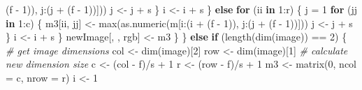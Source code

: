 \documentclass[
  12pt,
]{krantz}
\makeatletter
\newenvironment{Shaded}{\begin{snugshade}}{\end{snugshade}}
\newcommand{\AttributeTok}[1]{\textcolor[rgb]{0.61,0.61,0.61}{#1}}
\newcommand{\CommentTok}[1]{\textcolor[rgb]{0.37,0.37,0.37}{\textit{#1}}}
\newcommand{\ControlFlowTok}[1]{\textcolor[rgb]{0.27,0.27,0.27}{\textbf{#1}}}
\newcommand{\DecValTok}[1]{\textcolor[rgb]{0.06,0.06,0.06}{#1}}
\newcommand{\FunctionTok}[1]{\textcolor[rgb]{0,0,0}{#1}}
\newcommand{\NormalTok}[1]{#1}
\newcommand{\OtherTok}[1]{\textcolor[rgb]{0.37,0.37,0.37}{#1}}
\newcommand{\SpecialCharTok}[1]{\textcolor[rgb]{0,0,0}{#1}}
\newenvironment{kframe}{%
\medskip{}
\setlength{\fboxsep}{.8em}
 \def\at@end@of@kframe{}%
 \ifinner\ifhmode%
  \def\at@end@of@kframe{\end{minipage}}%
  \begin{minipage}{\columnwidth}%
 \fi\fi%
 \def\FrameCommand##1{\hskip\@totalleftmargin \hskip-\fboxsep
 \colorbox{shadecolor}{##1}\hskip-\fboxsep
     \hskip-\linewidth \hskip-\@totalleftmargin \hskip\columnwidth}%
 \MakeFramed {\advance\hsize-\width
   \@totalleftmargin\z@ \linewidth\hsize
   \@setminipage}}%
 {\par\unskip\endMakeFramed%
 \at@end@of@kframe}
\renewenvironment{Shaded}{\begin{kframe}}{\end{kframe}}
\makeatother
\begin{document}
\begin{Shaded}
\begin{Highlighting}[]
\NormalTok{                      (f }\SpecialCharTok{{-}} \DecValTok{1}\NormalTok{)), j}\SpecialCharTok{:}\NormalTok{(j }\SpecialCharTok{+}\NormalTok{ (f }\SpecialCharTok{{-}} \DecValTok{1}\NormalTok{))]))}
\NormalTok{                    j }\OtherTok{\textless{}{-}}\NormalTok{ j }\SpecialCharTok{+}\NormalTok{ s}
\NormalTok{                  \}}
\NormalTok{                  i }\OtherTok{\textless{}{-}}\NormalTok{ i }\SpecialCharTok{+}\NormalTok{ s}
\NormalTok{                \} }\ControlFlowTok{else} \ControlFlowTok{for}\NormalTok{ (ii }\ControlFlowTok{in} \DecValTok{1}\SpecialCharTok{:}\NormalTok{r) \{}
\NormalTok{                j }\OtherTok{=} \DecValTok{1}
                \ControlFlowTok{for}\NormalTok{ (jj }\ControlFlowTok{in} \DecValTok{1}\SpecialCharTok{:}\NormalTok{c) \{}
\NormalTok{                  m3[ii, jj] }\OtherTok{\textless{}{-}} \FunctionTok{max}\NormalTok{(}\FunctionTok{as.numeric}\NormalTok{(m[i}\SpecialCharTok{:}\NormalTok{(i }\SpecialCharTok{+}
\NormalTok{                    (f }\SpecialCharTok{{-}} \DecValTok{1}\NormalTok{)), j}\SpecialCharTok{:}\NormalTok{(j }\SpecialCharTok{+}\NormalTok{ (f }\SpecialCharTok{{-}} \DecValTok{1}\NormalTok{))]))}
\NormalTok{                  j }\OtherTok{\textless{}{-}}\NormalTok{ j }\SpecialCharTok{+}\NormalTok{ s}
\NormalTok{                \}}
\NormalTok{                i }\OtherTok{\textless{}{-}}\NormalTok{ i }\SpecialCharTok{+}\NormalTok{ s}
\NormalTok{            \}}
\NormalTok{            newImage[, , rgb] }\OtherTok{\textless{}{-}}\NormalTok{ m3}
\NormalTok{        \}}
\NormalTok{    \} }\ControlFlowTok{else} \ControlFlowTok{if}\NormalTok{ (}\FunctionTok{length}\NormalTok{(}\FunctionTok{dim}\NormalTok{(image)) }\SpecialCharTok{==} \DecValTok{2}\NormalTok{) \{}
        \CommentTok{\# get image dimensions}
\NormalTok{        col }\OtherTok{\textless{}{-}} \FunctionTok{dim}\NormalTok{(image)[}\DecValTok{2}\NormalTok{]}
\NormalTok{        row }\OtherTok{\textless{}{-}} \FunctionTok{dim}\NormalTok{(image)[}\DecValTok{1}\NormalTok{]}
        \CommentTok{\# calculate new dimension size}
\NormalTok{        c }\OtherTok{\textless{}{-}}\NormalTok{ (col }\SpecialCharTok{{-}}\NormalTok{ f)}\SpecialCharTok{/}\NormalTok{s }\SpecialCharTok{+} \DecValTok{1}
\NormalTok{        r }\OtherTok{\textless{}{-}}\NormalTok{ (row }\SpecialCharTok{{-}}\NormalTok{ f)}\SpecialCharTok{/}\NormalTok{s }\SpecialCharTok{+} \DecValTok{1}
\NormalTok{        m3 }\OtherTok{\textless{}{-}} \FunctionTok{matrix}\NormalTok{(}\DecValTok{0}\NormalTok{, }\AttributeTok{ncol =}\NormalTok{ c, }\AttributeTok{nrow =}\NormalTok{ r)}
\NormalTok{        i }\OtherTok{\textless{}{-}} \DecValTok{1}

\end{Highlighting}
\end{Shaded}
\end{document}
